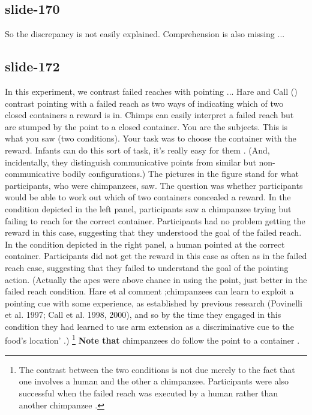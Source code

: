 \documentclass[12pt,\papersize]{extarticle}
\begin{document}
 
\subsection{slide-170}
So the discrepancy is not easily explained.
Comprehension is also missing ...
 
 
\subsection{slide-172}
In this experiment, we contrast failed reaches with pointing ...
Hare and Call (\citeyear{hare_chimpanzees_2004}) contrast pointing with a failed reach as two ways of indicating which of two closed containers a reward is in. Chimps can easily interpret a failed reach but are stumped by the point to a closed container.
You are the subjects. This is what you saw (two conditions). Your task was to choose the container with the reward.
Infants can do this sort of task, it's really easy for them \citep{Behne:2005qh}. (And, incidentally, they distinguish communicative points from similar but non-communicative bodily configurations.)
The pictures in the figure stand for what participants, who were chimpanzees, saw.
The question was whether participants would be able to work out which of two containers concealed a reward.
In the condition depicted in the left panel, participants saw a chimpanzee trying but failing to reach for the correct container.
Participants had no problem getting the reward in this case, suggesting that they understood the goal of the failed reach.
In the condition depicted in the right panel, a human pointed at the correct container.
Participants did not get the reward in this case as often as in the failed reach case, suggesting that they failed to understand the goal of the pointing action.
(Actually the apes were above chance in using the point, just better in the failed reach condition. Hare et al comment ;chimpanzees can learn to exploit a pointing cue with some experience, as established by previous research (Povinelli et al. 1997; Call et al. 1998, 2000), and so by the time they engaged in this condition they had learned to use arm extension as a discriminative cue to the food’s location' \citep[p.\ 578]{hare_chimpanzees_2004}.)
\footnote{ The contrast between the two conditions is not due merely to the fact that one involves a human and the other a chimpanzee. Participants were also successful when the failed reach was executed by a human rather than another chimpanzee \citep[][experiment 1]{hare_chimpanzees_2004}. }
\textbf{Note that} chimpanzees do follow the point to a container \citep[see][p.\ 6]{Moll:2007gu}.
 
\end{document}
